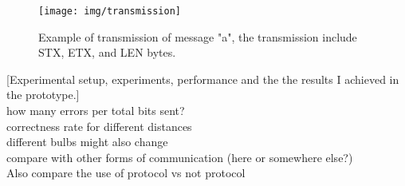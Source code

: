 \begin{figure}
\centering
\texttt{[image: img/transmission]}
\caption{Example of transmission of message "a", the transmission include STX, ETX, and LEN bytes.}
\label{fig:transmissionA}
\end{figure}

[Experimental setup, experiments, performance and the the results I achieved in the prototype.]\\
how many errors per total bits sent?\\
correctness rate for different distances\\
different bulbs might also change\\
compare with other forms of communication (here or somewhere else?)\\
Also compare the use of protocol vs not protocol\\